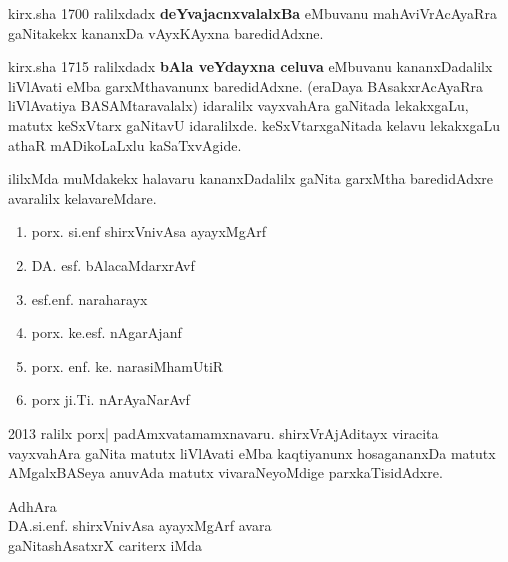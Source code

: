 kirx.sha {\rm 1700} ralilxdadx \textbf{deYvajacnxvalalxBa} eMbuvanu mahAviVrAcAyaRra gaNitakekx kananxDa vAyxKAyxna baredidAdxne.

kirx.sha {\rm 1715} ralilxdadx \textbf{bAla veYdayxna celuva} eMbuvanu kananxDadalilx liVlAvati eMba garxMthavanunx baredidAdxne. (eraDaya BAsakxrAcAyaRra liVlAvatiya BASAMtaravalalx) idaralilx vayxvahAra gaNitada lekakxgaLu, matutx keSxVtarx gaNitavU idaralilxde. keSxVtarxgaNitada kelavu lekakxgaLu athaR mADikoLaLxlu kaSaTxvAgide.

ililxMda muMdakekx halavaru kananxDadalilx gaNita garxMtha baredidAdxre avaralilx kelavareMdare.
\begin{enumerate}[\rm 1)]
\item porx. si.enf shirxVnivAsa ayayxMgArf

\item DA. esf. bAlacaMdarxrAvf

\item esf.enf. naraharayx

\item porx. ke.esf. nAgarAjanf

\item porx. enf. ke. narasiMhamUtiR

\item porx ji.Ti. nArAyaNarAvf

\end{enumerate}

{\rm 2013} ralilx porx| padAmxvatamamxnavaru. shirxVrAjAditayx viracita vayxvahAra gaNita matutx liVlAvati eMba kaqtiyanunx hosagananxDa matutx AMgalxBASeya anuvAda matutx vivaraNeyoMdige parxkaTisidAdxre.
\begin{flushright}
AdhAra\\
DA.si.enf. shirxVnivAsa ayayxMgArf avara\\
gaNitashAsatxrX cariterx iMda
\end{flushright}

